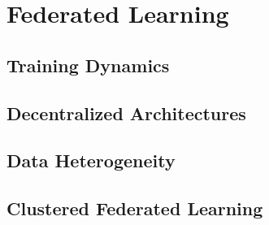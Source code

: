 
\chapter{Federated Learning}
\label{chap:federated-learning}
\minitoc
\section{Training Dynamics}
\section{Decentralized Architectures}
\section{Data Heterogeneity}
\section{Clustered Federated Learning}
